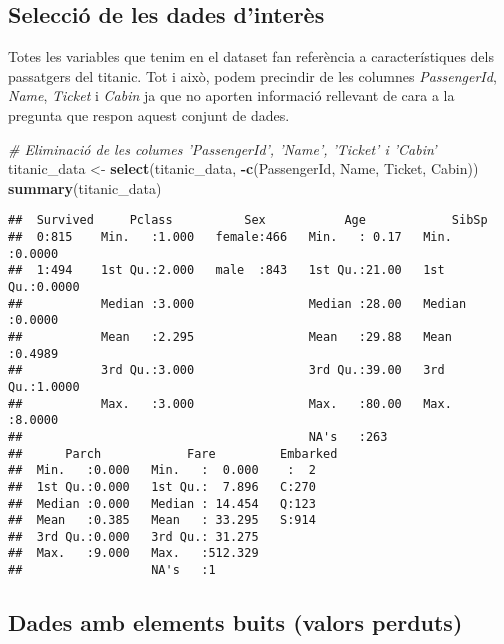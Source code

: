 \documentclass[]{article}
\newenvironment{Shaded}{\begin{snugshade}}{\end{snugshade}}
\newcommand{\CommentTok}[1]{\textcolor[rgb]{0.56,0.35,0.01}{\textit{#1}}}
\newcommand{\KeywordTok}[1]{\textcolor[rgb]{0.13,0.29,0.53}{\textbf{#1}}}
\newcommand{\NormalTok}[1]{#1}
\newcommand{\OperatorTok}[1]{\textcolor[rgb]{0.81,0.36,0.00}{\textbf{#1}}}
\newcommand{\StringTok}[1]{\textcolor[rgb]{0.31,0.60,0.02}{#1}}
\begin{document}
\hypertarget{selecciuxf3-de-les-dades-dinteruxe8s}{%
\subsection{Selecció de les dades
d'interès}\label{selecciuxf3-de-les-dades-dinteruxe8s}}

Totes les variables que tenim en el dataset fan referència a
característiques dels passatgers del titanic. Tot i això, podem
precindir de les columnes \emph{PassengerId}, \emph{Name}, \emph{Ticket}
i \emph{Cabin} ja que no aporten informació rellevant de cara a la
pregunta que respon aquest conjunt de dades.

\begin{Shaded}
\begin{Highlighting}[]
\CommentTok{# Eliminació de les columes 'PassengerId', 'Name', 'Ticket' i 'Cabin'}
\NormalTok{titanic_data <-}\StringTok{ }\KeywordTok{select}\NormalTok{(titanic_data, }\OperatorTok{-}\KeywordTok{c}\NormalTok{(PassengerId, Name, Ticket, Cabin))}
\KeywordTok{summary}\NormalTok{(titanic_data)}
\end{Highlighting}
\end{Shaded}

\begin{verbatim}
##  Survived     Pclass          Sex           Age            SibSp       
##  0:815    Min.   :1.000   female:466   Min.   : 0.17   Min.   :0.0000  
##  1:494    1st Qu.:2.000   male  :843   1st Qu.:21.00   1st Qu.:0.0000  
##           Median :3.000                Median :28.00   Median :0.0000  
##           Mean   :2.295                Mean   :29.88   Mean   :0.4989  
##           3rd Qu.:3.000                3rd Qu.:39.00   3rd Qu.:1.0000  
##           Max.   :3.000                Max.   :80.00   Max.   :8.0000  
##                                        NA's   :263                     
##      Parch            Fare         Embarked
##  Min.   :0.000   Min.   :  0.000    :  2   
##  1st Qu.:0.000   1st Qu.:  7.896   C:270   
##  Median :0.000   Median : 14.454   Q:123   
##  Mean   :0.385   Mean   : 33.295   S:914   
##  3rd Qu.:0.000   3rd Qu.: 31.275           
##  Max.   :9.000   Max.   :512.329           
##                  NA's   :1
\end{verbatim}

\hypertarget{dades-amb-elements-buits-valors-perduts}{%
\subsection{Dades amb elements buits (valors
perduts)}\label{dades-amb-elements-buits-valors-perduts}}
\end{document}
